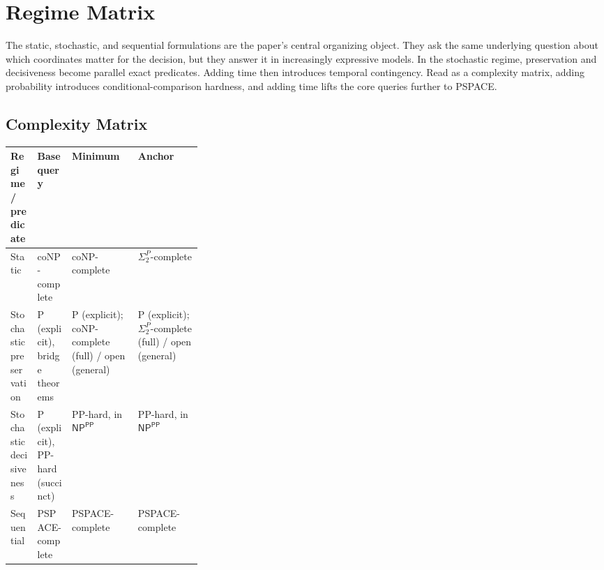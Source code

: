 \section{Regime Matrix}\label{sec:regime-hierarchy}

The static, stochastic, and sequential formulations are the paper's central organizing object. They ask the same underlying question about which coordinates matter for the decision, but they answer it in increasingly expressive models. In the stochastic regime, preservation and decisiveness become parallel exact predicates. Adding time then introduces temporal contingency. Read as a complexity matrix, adding probability introduces conditional-comparison hardness, and adding time lifts the core queries further to PSPACE.

\subsection{Complexity Matrix}

\begin{center}
\begingroup
\renewcommand{\tabularxcolumn}[1]{m{#1}}
\begin{tabularx}{\linewidth}{@{}>{\RaggedRight\arraybackslash\hyphenpenalty=10000\exhyphenpenalty=10000}m{0.14\linewidth}>{\RaggedRight\arraybackslash}m{0.18\linewidth}>{\RaggedRight\arraybackslash}X>{\RaggedRight\arraybackslash}X@{}}
\toprule
\textbf{Regime /} \textbf{predicate} & \textbf{Base query} & \textbf{Minimum} & \textbf{Anchor} \\
\midrule
Static & coNP-complete & coNP-complete & $\Sigma_2^P$-complete \\
\midrule
Stochastic preservation & P (explicit), bridge theorems & P (explicit); coNP-complete (full) / open (general) & P (explicit); $\Sigma_2^P$-complete (full) / open (general) \\
\midrule
Stochastic decisiveness & P (explicit), PP-hard (succinct) & PP-hard, in $\textsf{NP}^{\textsf{PP}}$ & PP-hard, in $\textsf{NP}^{\textsf{PP}}$ \\
\midrule
Sequential & PSPACE-complete & PSPACE-complete & PSPACE-complete \\
\bottomrule
\end{tabularx}
\endgroup
\end{center}


